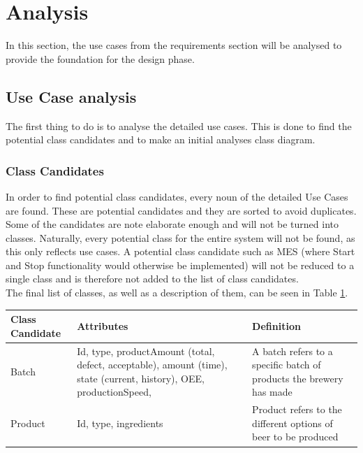 \section{Analysis}
In this section, the use cases from the requirements section will be analysed
to provide the foundation for the design phase.

\subsection{Use Case analysis}
The first thing to do is to analyse the detailed use cases. This is done to find
the potential class candidates and to make an initial analyses class diagram.

\subsubsection{Class Candidates}
In order to find potential class candidates, every noun of the detailed Use
Cases are found. These are potential candidates and they are sorted to avoid
duplicates. Some of the candidates are note elaborate enough and will not be
turned into classes. Naturally, every potential class for the entire system will
not be found, as this only reflects use cases. A potential class candidate such
as MES (where Start and Stop functionality would otherwise be implemented) will
not be reduced to a single class and is therefore not added to the list of class
candidates.\\

The final list of classes, as well as a description of them, can be seen in
Table \ref{table:class_candidates}.

\begin{table}[ht]
    \begin{tabularx}{\textwidth}{|>{\RaggedRight}p{4cm}|>{\RaggedRight}p{6cm}|>{\RaggedRight}X|}
    \hline
    \textbf{Class Candidate} & \textbf{Attributes}                                                                                                     & \textbf{Definition}                                                                    \\ \hline
    Batch                    & Id, type, productAmount (total, defect, acceptable), amount (time), state (current, history), OEE, productionSpeed, & A batch refers to a specific batch of products the brewery has made                    \\ \hline
    Product                  & Id, type, ingredients                                                                                                  & Product refers to the different options of beer to be produced                         \\ \hline
    \end{tabularx}
    \label{table:class_candidates}
    \end{table}


